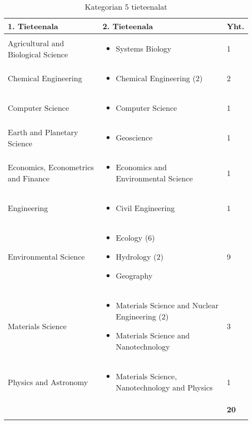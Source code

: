 \documentclass[utf8]{gradu3}
\begin{document}
\begin{longtable}[]{|p{5cm}|p{8cm}|p{1cm}|}
    \hline
    \textbf{1. Tieteenala}    & \textbf{2. Tieteenala} & \textbf{Yht.} \\
    \hline
    Agricultural and Biological Science  & \begin{itemize}
        \item Systems Biology
    \end{itemize} & 1 \\
    \hline
    Chemical Engineering & \begin{itemize}
        \item Chemical Engineering (2)
    \end{itemize} & 2 \\
    \hline
    Computer Science & \begin{itemize}
        \item Computer Science
    \end{itemize} & 1 \\
    \hline
    Earth and Planetary Science & \begin{itemize}
        \item Geoscience
    \end{itemize} & 1 \\
    \hline
    Economics, Econometrics and Finance & \begin{itemize}
        \item Economics and Environmental Science
    \end{itemize} & 1 \\
    \hline
    Engineering & \begin{itemize}
        \item Civil Engineering
    \end{itemize} & 1 \\
    \hline
    Environmental Science & \begin{itemize}
        \item Ecology (6)
        \item Hydrology (2)
        \item Geography
    \end{itemize} & 9 \\
    \hline
    Materials Science & \begin{itemize}
        \item Materials Science and Nuclear Engineering (2)
        \item Materials Science and Nanotechnology 
    \end{itemize} & 3 \\
    \hline
    Physics and Astronomy & \begin{itemize}
        \item Materials Science, Nanotechnology and Physics
    \end{itemize} & 1 \\
    \hline
       &   & \textbf{20} \\
    \hline
    \caption{Kategorian 5 tieteenalat}
    \label{table:Kategorian 5 tieteenalat}
\end{longtable}
\end{document}
